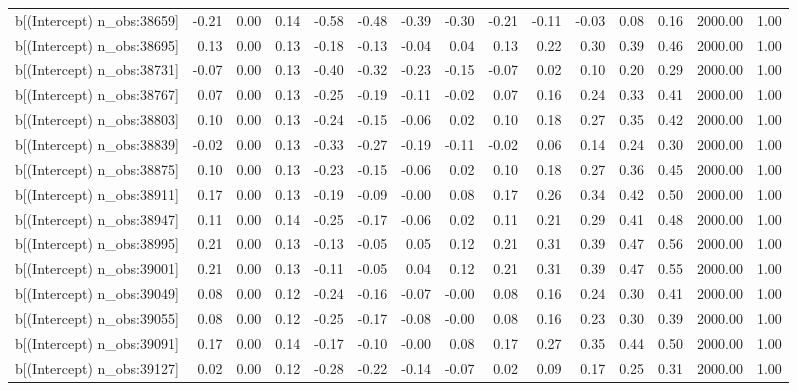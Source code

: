 \begin{table}[ht]
\begin{tabular}{rrrrrrrrrrrrrrr}
  b[(Intercept) n\_obs:38659] & -0.21 & 0.00 & 0.14 & -0.58 & -0.48 & -0.39 & -0.30 & -0.21 & -0.11 & -0.03 & 0.08 & 0.16 & 2000.00 & 1.00 \\ 
  b[(Intercept) n\_obs:38695] & 0.13 & 0.00 & 0.13 & -0.18 & -0.13 & -0.04 & 0.04 & 0.13 & 0.22 & 0.30 & 0.39 & 0.46 & 2000.00 & 1.00 \\ 
  b[(Intercept) n\_obs:38731] & -0.07 & 0.00 & 0.13 & -0.40 & -0.32 & -0.23 & -0.15 & -0.07 & 0.02 & 0.10 & 0.20 & 0.29 & 2000.00 & 1.00 \\ 
  b[(Intercept) n\_obs:38767] & 0.07 & 0.00 & 0.13 & -0.25 & -0.19 & -0.11 & -0.02 & 0.07 & 0.16 & 0.24 & 0.33 & 0.41 & 2000.00 & 1.00 \\ 
  b[(Intercept) n\_obs:38803] & 0.10 & 0.00 & 0.13 & -0.24 & -0.15 & -0.06 & 0.02 & 0.10 & 0.18 & 0.27 & 0.35 & 0.42 & 2000.00 & 1.00 \\ 
  b[(Intercept) n\_obs:38839] & -0.02 & 0.00 & 0.13 & -0.33 & -0.27 & -0.19 & -0.11 & -0.02 & 0.06 & 0.14 & 0.24 & 0.30 & 2000.00 & 1.00 \\ 
  b[(Intercept) n\_obs:38875] & 0.10 & 0.00 & 0.13 & -0.23 & -0.15 & -0.06 & 0.02 & 0.10 & 0.18 & 0.27 & 0.36 & 0.45 & 2000.00 & 1.00 \\ 
  b[(Intercept) n\_obs:38911] & 0.17 & 0.00 & 0.13 & -0.19 & -0.09 & -0.00 & 0.08 & 0.17 & 0.26 & 0.34 & 0.42 & 0.50 & 2000.00 & 1.00 \\ 
  b[(Intercept) n\_obs:38947] & 0.11 & 0.00 & 0.14 & -0.25 & -0.17 & -0.06 & 0.02 & 0.11 & 0.21 & 0.29 & 0.41 & 0.48 & 2000.00 & 1.00 \\ 
  b[(Intercept) n\_obs:38995] & 0.21 & 0.00 & 0.13 & -0.13 & -0.05 & 0.05 & 0.12 & 0.21 & 0.31 & 0.39 & 0.47 & 0.56 & 2000.00 & 1.00 \\ 
  b[(Intercept) n\_obs:39001] & 0.21 & 0.00 & 0.13 & -0.11 & -0.05 & 0.04 & 0.12 & 0.21 & 0.31 & 0.39 & 0.47 & 0.55 & 2000.00 & 1.00 \\ 
  b[(Intercept) n\_obs:39049] & 0.08 & 0.00 & 0.12 & -0.24 & -0.16 & -0.07 & -0.00 & 0.08 & 0.16 & 0.24 & 0.30 & 0.41 & 2000.00 & 1.00 \\ 
  b[(Intercept) n\_obs:39055] & 0.08 & 0.00 & 0.12 & -0.25 & -0.17 & -0.08 & -0.00 & 0.08 & 0.16 & 0.23 & 0.30 & 0.39 & 2000.00 & 1.00 \\ 
  b[(Intercept) n\_obs:39091] & 0.17 & 0.00 & 0.14 & -0.17 & -0.10 & -0.00 & 0.08 & 0.17 & 0.27 & 0.35 & 0.44 & 0.50 & 2000.00 & 1.00 \\ 
  b[(Intercept) n\_obs:39127] & 0.02 & 0.00 & 0.12 & -0.28 & -0.22 & -0.14 & -0.07 & 0.02 & 0.09 & 0.17 & 0.25 & 0.31 & 2000.00 & 1.00 \\ 

\end{tabular}
\end{table}
